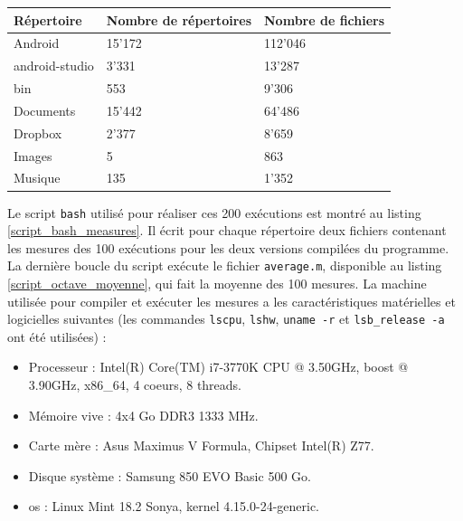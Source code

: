 \begin{center}
    \begin{tabularx}{13cm}{|X|X|X|} \hline
        \textbf{Répertoire} & \textbf{Nombre de répertoires} & \textbf{Nombre de fichiers} \\ \hline
        Android & 15'172 & 112'046 \\ \hline
        android-studio & 3'331 & 13'287 \\ \hline
        bin & 553 & 9'306 \\ \hline
        Documents & 15'442 & 64'486 \\ \hline
        Dropbox & 2'377 & 8'659 \\ \hline
        Images & 5 & 863 \\ \hline
        Musique & 135 & 1'352 \\ \hline
    \end{tabularx}
    \label{tests_directories}
\end{center}
Le script \texttt{bash} utilisé pour réaliser ces 200 exécutions est montré au listing 
\ref{script_bash_measures}. Il écrit pour chaque répertoire deux fichiers contenant les mesures des 100 exécutions 
pour les deux versions compilées du programme. La dernière boucle du script exécute le fichier 
\texttt{average.m}, disponible au listing \ref{script_octave_moyenne}, qui fait la 
moyenne des 100 mesures.
La machine utilisée pour compiler et exécuter les mesures a les caractéristiques matérielles et 
logicielles suivantes (les commandes \texttt{lscpu}, \texttt{lshw}, 
\texttt{uname -r} et \texttt{lsb_release -a} ont été utilisées) :
\begin{itemize}
    \item Processeur : Intel(R) Core(TM) i7-3770K CPU @ 3.50GHz, boost @ 3.90GHz, x86\_64, 4 coeurs, 8 threads.
    \item Mémoire vive : 4x4 Go DDR3 1333 MHz.
    \item Carte mère : Asus Maximus V Formula, Chipset Intel(R) Z77.
    \item Disque système : Samsung 850 EVO Basic 500 Go.
    \item \acrshort{os} : Linux Mint 18.2 Sonya, kernel 4.15.0-24-generic.
\end{itemize}
\bigbreak
{}
